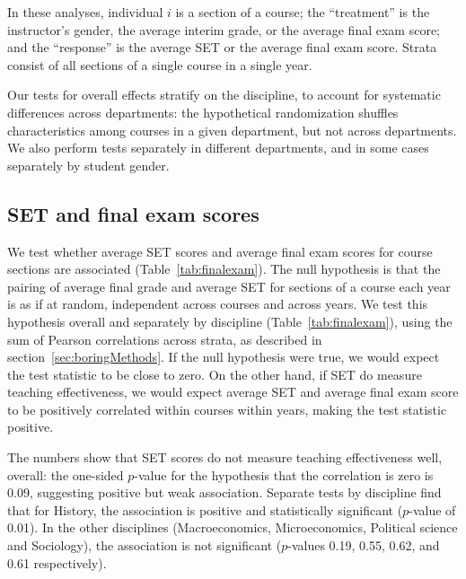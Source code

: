 \documentclass[12pt]{article}
\begin{document}
In these analyses, individual $i$ is a section of a course; the ``treatment'' is the instructor's gender, 
the average interim grade, or the average final exam score;
and the ``response'' is the average SET or the average final exam score.
Strata consist of all sections of a single course in a single year.

Our tests for overall effects stratify on the discipline, to account for systematic
differences across departments:
the hypothetical randomization shuffles characteristics among courses in a given
department, but not across departments.
We also perform tests separately in different departments, and in some cases separately by
student gender.

\subsection{SET and final exam scores} \label{sec:Fr-set-final}
We test whether average SET scores and average final exam scores for course
sections are associated (Table~\ref{tab:finalexam}). 
The null hypothesis is that the pairing
of average final grade and average SET for sections of a course each year is as if at random,
independent across courses and across years.
We test this hypothesis overall and separately by discipline 
(Table~\ref{tab:finalexam}), using the sum of Pearson correlations across strata, as described 
in section~\ref{sec:boringMethods}.
If the null hypothesis were true, we would expect the test statistic to be 
close to zero.
On the other hand, if SET do measure teaching effectiveness, we would expect average
SET and average final exam score to be positively correlated within courses within years, 
making the test statistic positive. 

The numbers show that SET scores do not measure teaching effectiveness well, overall:
the one-sided $p$-value for the hypothesis that the correlation is zero is 0.09, suggesting positive but weak association. 
Separate tests by discipline find that for History, the 
association is positive and statistically
significant ($p$-value of 0.01). In the other disciplines (Macroeconomics, Microeconomics, Political science and Sociology), the association is not significant ($p$-values 0.19, 0.55, 0.62, and 0.61 respectively). 
\end{document}

